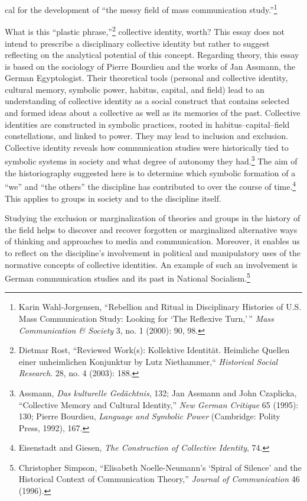 \documentclass{tufte-handout}
\begin{document}
\noindent cal for the
development of ``the messy field of mass communication
study.''\footnote{Karin Wahl-Jorgensen, ``Rebellion and Ritual in Disciplinary Histories
  of U.S. Mass Communication Study: Looking for `The Reflexive
  Turn,'\,'' \emph{Mass Communication \& Society} 3, no. 1 (2000): 90,
  98.
}

What is this ``plastic phrase,''\footnote{Dietmar Rost, ``Reviewed Work(s): Kollektive Identität. Heimliche
  Quellen einer unheimlichen Konjunktur by Lutz Niethammer,``
  \emph{Historical Social Research}. 28, no. 4 (2003): 188.
}
collective identity, worth? This essay does not intend to prescribe a
disciplinary collective identity but rather to suggest reflecting on the
analytical potential of this concept. Regarding theory, this essay is
based on the sociology of Pierre Bourdieu and the works of Jan Assmann,
the German Egyptologist. Their theoretical tools (personal and
collective identity, cultural memory, symbolic power, habitus, capital,
and field) lead to an understanding of collective identity as a social
construct that contains selected and formed ideas about a collective as
well as its memories of the past. Collective identities are constructed
in symbolic practices, rooted in habitus--capital--field constellations,
and linked to power. They may lead to inclusion and exclusion.
Collective identity reveals how communication studies were historically
tied to symbolic systems in society and what degree of autonomy they
had.\footnote{Assmann, \emph{Das kulturelle Gedächtnis}, 132; Jan Assmann and John
  Czaplicka, ``Collective Memory and Cultural Identity,'' \emph{New
  German Critique} 65 (1995): 130; Pierre Bourdieu, \emph{Language and
  Symbolic Power} (Cambridge: Polity Press, 1992), 167.
} The aim of the historiography
suggested here is to determine which symbolic formation of a ``we'' and
``the others'' the discipline has contributed to over the course of
time.\footnote{Eisenstadt and Giesen, \emph{The Construction of Collective Identity},
  74.
} This applies to groups in
society and to the discipline itself.

Studying the exclusion or marginalization of theories and groups in the
history of the field helps to discover and recover forgotten or
marginalized alternative ways of thinking and approaches to media and
communication. Moreover, it enables us to reflect on the discipline's
involvement in political and manipulatory uses of the normative concepts
of collective identities. An example of such an involvement is German
communication studies and its past in National
Socialism.\footnote{Christopher Simpson, ``Elisabeth Noelle-Neumann's `Spiral of Silence'
  and the Historical Context of Communication Theory,'' \emph{Journal of
  Communication} 46 (1996).
}
\end{document}
